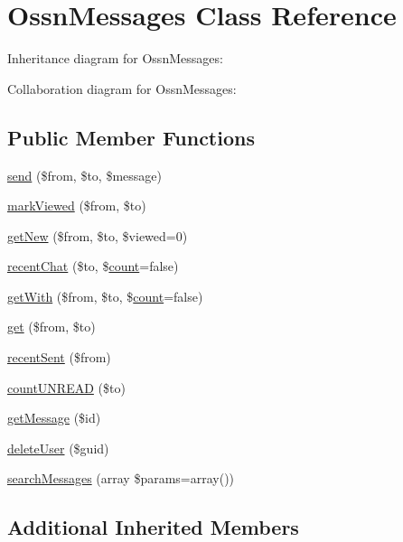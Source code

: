 \hypertarget{class_ossn_messages}{}\section{Ossn\+Messages Class Reference}
\label{class_ossn_messages}


Inheritance diagram for Ossn\+Messages\+:


Collaboration diagram for Ossn\+Messages\+:
\subsection*{Public Member Functions}
\begin{DoxyCompactItemize}
\item 
\hyperlink{class_ossn_messages_a3e5128f5d2857f5ff72e6ec15455a2a6}{send} (\$from, \$to, \$message)
\item 
\hyperlink{class_ossn_messages_af9e75a329022d58cdf3742ca19ebda68}{mark\+Viewed} (\$from, \$to)
\item 
\hyperlink{class_ossn_messages_afaaef0fcadfb9521efb2f49ebdb25fbc}{get\+New} (\$from, \$to, \$viewed=0)
\item 
\hyperlink{class_ossn_messages_a26f8b312de2c588a8ea96184c150fa39}{recent\+Chat} (\$to, \$\hyperlink{photos_2pages_2photos_8php_a364678aa3bd05301b3d1b8650653cf48}{count}=false)
\item 
\hyperlink{class_ossn_messages_a90114bac6a16fdcc0a7460b203c3db26}{get\+With} (\$from, \$to, \$\hyperlink{photos_2pages_2photos_8php_a364678aa3bd05301b3d1b8650653cf48}{count}=false)
\item 
\hyperlink{class_ossn_messages_ac375857b49f863c35a6ee8e16f7ab3ab}{get} (\$from, \$to)
\item 
\hyperlink{class_ossn_messages_a8bd65f3deb7732d3ef5ca956de3cbe99}{recent\+Sent} (\$from)
\item 
\hyperlink{class_ossn_messages_a036648502ef138f00ae0d9adf3489e70}{count\+U\+N\+R\+E\+AD} (\$to)
\item 
\hyperlink{class_ossn_messages_a86ea515928072d5f7cf1f112d3031782}{get\+Message} (\$id)
\item 
\hyperlink{class_ossn_messages_a1ee5c14cba7ef4ca5c2b6154aef04ebc}{delete\+User} (\$guid)
\item 
\hyperlink{class_ossn_messages_ae63911d6ccb295518e7febf0fb35da15}{search\+Messages} (array \$params=array())
\end{DoxyCompactItemize}
\subsection*{Additional Inherited Members}


